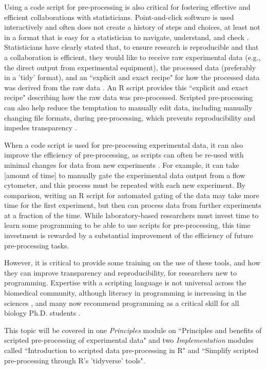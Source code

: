 \documentclass[pdftex,english,11pt,parskip=half]{scrartcl}
\begin{document}
Using a code script for pre-processing is also critical for fostering effective and efficient collaborations with statisticians. Point-and-click software is used interactively and often does not create a history of steps and choices, at least not in a format that is easy for a statistician to navigate, understand, and check \cite{peng2011reproducible, pernet2015improving}. Statisticians have clearly stated that, to ensure research is reproducible and that a collaboration is efficient, they would like to receive raw experimental data (e.g., the direct output from experimental equipment), the processed data (preferably in a 'tidy' format), and an ``explicit and exact recipe" for how the processed data was derived from the raw data \cite{ellis2018share}. An R script provides this ``explicit and exact recipe" describing how the raw data was pre-processed. Scripted pre-processing can also help reduce the temptation to manually edit data, including manually changing file formats, during pre-processing, which prevents reproducibility and impedes transparency \cite{pernet2015improving}.

When a code script is used for pre-processing experimental data, it can also improve the efficiency of pre-processing, as scripts can often be re-used with minimal changes for data from new experiments \cite{pernet2015improving}. For example, it can take [amount of time] to manually gate the experimental data output from a flow cytometer, and this process must be repeated with each new experiment. By comparison, writing an R script for automated gating of the data may take more time for the first experiment, but then can process data from further experiments at a fraction of the time. While laboratory-based researchers must invest time to learn some programming to be able to use scripts for pre-processing, this time investment is rewarded by a substantial improvement of the efficiency of future pre-processing tasks. 

However, it is critical to provide some
training on the use of these tools, and how they can improve transparency and reproducibility, for researchers new to programming. Expertise
with a scripting language is not universal across the biomedical community,
although literacy in programming is increasing in the sciences
\cite{ram2013git}, and many now recommend programming as a critical skill for
all biology Ph.D. students \cite{list2017ten}. 

This topic will be covered in one
\textit{Principles} module on ``Principles and benefits of scripted
pre-processing of experimental data" and two \textit{Implementation} modules
called ``Introduction to scripted data pre-processing in R" and ``Simplify
scripted pre-processing through R's 'tidyverse' tools".
\end{document}
